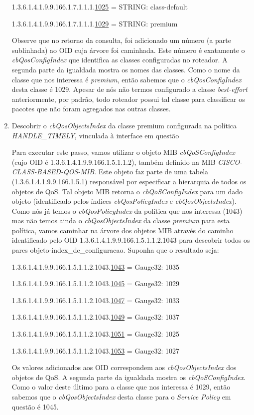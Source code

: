 \begin{enumerate}
1.3.6.1.4.1.9.9.166.1.7.1.1.1.\underline{1025} = STRING: class-default

1.3.6.1.4.1.9.9.166.1.7.1.1.1.\underline{1029} = STRING: premium

Observe que no retorno da consulta, foi adicionado um número (a parte sublinhada) ao OID cuja árvore foi caminhada. Este número é exatamente o \textit{cbQosConfigIndex} que identifica as classes configuradas no roteador. A segunda parte da igualdada mostra os nomes das classes. Como o nome da classe que nos interessa é \textit{premium}, então sabemos que o \textit{cbQosConfigIndex} desta classe é 1029. Apesar de nós não termos configurado a classe \textit{best-effort} anteriormente, por padrão, todo roteador possui tal classe para classificar os pacotes que não foram agregados nas outras classes.

\item Descobrir o \textit{cbQosObjectsIndex} da classe premium configurada na política \textit{HANDLE\_TIMELY}, vinculada à interface em questão

Para executar este passo, vamos utilizar o objeto MIB \textit{cbQoSConfigIndex} (cujo OID é 1.3.6.1.4.1.9.9.166.1.5.1.1.2), também definido na MIB \textit{CISCO-CLASS-BASED-QOS-MIB}. Este objeto faz parte de uma tabela (1.3.6.1.4.1.9.9.166.1.5.1) responsável por especificar a hierarquia de todos os objetos de QoS. Tal objeto MIB retorna o \textit{cbQoSConfigIndex} para um dado objeto (identificado pelos índices \textit{cbQosPolicyIndex} e \textit{cbQosObjectsIndex}). Como nós já temos o \textit{cbQosPolicyIndex} da política que nos interessa (1043) mas não temos ainda o \textit{cbQosObjectsIndex} da classe \textit{premium} para esta política, vamos caminhar na árvore dos objetos MIB através do caminho identificado pelo OID 1.3.6.1.4.1.9.9.166.1.5.1.1.2.1043 para descobrir todos os pares objeto-index\_de\_configuracao. Suponha que o resultado seja:

1.3.6.1.4.1.9.9.166.1.5.1.1.2.1043.\underline{1043} = Gauge32: 1035

1.3.6.1.4.1.9.9.166.1.5.1.1.2.1043.\underline{1045} = Gauge32: 1029

1.3.6.1.4.1.9.9.166.1.5.1.1.2.1043.\underline{1047} = Gauge32: 1033

1.3.6.1.4.1.9.9.166.1.5.1.1.2.1043.\underline{1049} = Gauge32: 1037

1.3.6.1.4.1.9.9.166.1.5.1.1.2.1043.\underline{1051} = Gauge32: 1025

1.3.6.1.4.1.9.9.166.1.5.1.1.2.1043.\underline{1053} = Gauge32: 1027

Os valores adicionados aos OID correspondem aos \textit{cbQosObjectsIndex} dos objetos de QoS. A segunda parte da igualdada mostra os \textit{cbQoSConfigIndex}. Como o valor deste último para a classe que nos interessa é 1029, então sabemos que o \textit{cbQosObjectsIndex} desta classe para o \textit{Service Policy} em questão é 1045.
\end{enumerate}


